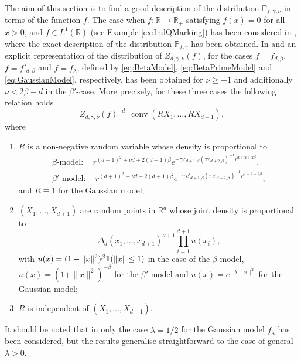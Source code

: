 \documentclass[11pt,a4paper]{article}
\theoremstyle{plain}
\theoremstyle{definition}
\theoremstyle{remark}
\def\PP{\mathbb{P}}
\def\RR{\mathbb{R}}
\newcommand{\conv}{\mathop{\mathrm{conv}}\nolimits}
\begin{document}
The aim of this section is to find a good description of the distribution $\PP_{f,\gamma,\nu}$ in terms of the function $f$. The case when $f\colon\RR\to \RR_+$ satisfying $f(x)=0$ for all $x>0$, and $f\in L^1(\RR)$ (see Example \ref{ex:IndQMarking}) has been considered in \cite{LZ08, Ldoc}, where the exact description of the distribution $\PP_{f,\gamma}$ has been obtained. In \cite[Theorem 4.5]{GKT20} and \cite[Theorem 5.1]{GKT21} an explicit representation of the distribution of $Z_{d,\gamma,\nu}(f)$, for the cases $f=f_{d,\beta}$, $f=f'_{d,\beta}$ and $f=\widetilde f_{\lambda}$, defined by \eqref{eq:BetaModel}, \eqref{eq:BetaPrimeModel} and \eqref{eq:GaussianModel}, respectively, has been obtained for $\nu\ge -1$ and additionally $\nu<2\beta-d$ in the $\beta'$-case. More precisely, for these three cases the following relation holds
\begin{equation}\label{eq:TypicalCellRepresentation}
    Z_{d,\gamma,\nu}(f)\overset{d}{=}\conv(RX_1,\ldots,RX_{d+1}),
\end{equation}
where
\begin{enumerate}
\item[(a)] $R$ is a non-negative random variable whose density is proportional to 
    \begin{align*}
        \beta\text{-model}:\quad r^{(d+1)^2+\nu d+2(d+1)\beta}e^{-\gamma\,c_{d+1,\beta}(\pi c_{d+2,\beta})^{-1}r^{d+2+2\beta}},\\
        \beta'\text{-model}:\quad r^{(d+1)^2+\nu d-2(d+1)\beta}e^{-\gamma\,c'_{d+1,\beta}(\pi c'_{d+2,\beta})^{-1}r^{d+2-2\beta}} ,
    \end{align*}
    and $R\equiv 1$ for the Gaussian model;
\item[(b)] $(X_1,\ldots,X_{d+1})$ are random points in $\RR^d$ whose joint density is proportional to
    \begin{equation}\label{eq:JointDensityX}
        \Delta_{d}(x_1,\ldots,x_{d+1})^{\nu+1}   \prod\limits_{i=1}^{d+1}u(x_i),
    \end{equation}
    with $u(x)=(1-\|x\|^2)^{\beta}{\bf 1}(\|x\|\leq 1)$ in the case of the $\beta$-model, $u(x)=(1+\|x\|^2)^{-\beta}$ for the $\beta'$-model and $u(x)=e^{-\lambda\|x\|^2}$ for the Gaussian model;
\item[(c)] $R$ is independent of $(X_1,\ldots,X_{d+1})$.
\end{enumerate}
It should be noted that in \cite[Theorem 5.1]{GKT21} only the case $\lambda=1/2$ for the Gaussian model $\widetilde f_{\lambda}$ has been considered, but the results generalise straightforward to the case of general $\lambda>0$.
\end{document}

